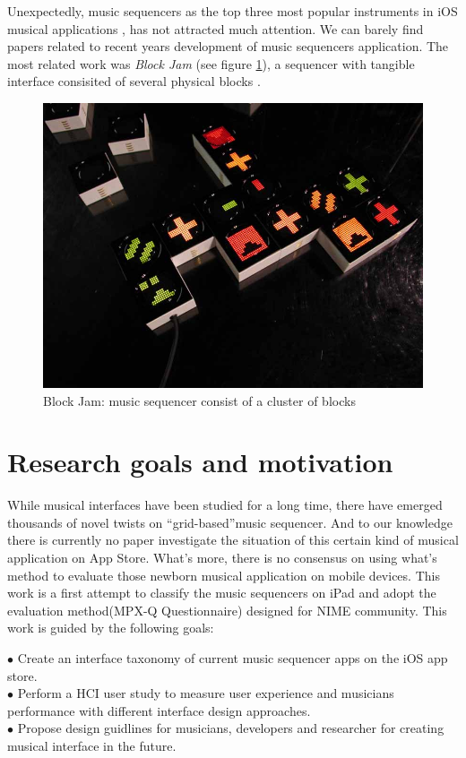 Unexpectedly, music sequencers as the top three most popular instruments in iOS musical applications \citep{Reference14}, has not attracted much attention. We can barely find papers related to recent years development of music sequencers application. The most related work was \textit{Block Jam} (see figure \ref{fig: Block Jam}), a sequencer with tangible interface consisited of several physical blocks \citep{Reference20}.

\bigskip
\begin{figure}[h]
  \includegraphics[width=12 cm]{images/blockjam.jpg}
  \centering
  \caption{Block Jam: music sequencer consist of a cluster of blocks}
  \label{fig: Block Jam}
\end{figure}
\bigskip

\section{Research goals and motivation}

While musical interfaces have been studied for a long time, there have emerged thousands of novel twists on \textquotedblleft{grid-based}\textquotedblright music sequencer. And to our knowledge there is currently no paper investigate the situation of this certain kind of musical application on App Store. What's more, there is no consensus on using what's method to evaluate those newborn musical application on mobile devices. This work is a first attempt to classify the music sequencers on iPad and adopt the evaluation method(MPX-Q Questionnaire) designed for NIME community. This work is guided by the following goals:
\begin{flushleft}
$\bullet$ Create an interface taxonomy of current music sequencer apps on the iOS app store.\\
$\bullet$ Perform a HCI user study to measure user experience and musicians performance with different interface design approaches.\\
$\bullet$ Propose design guidlines for musicians, developers and researcher for creating musical interface in the future.
\end{flushleft}

